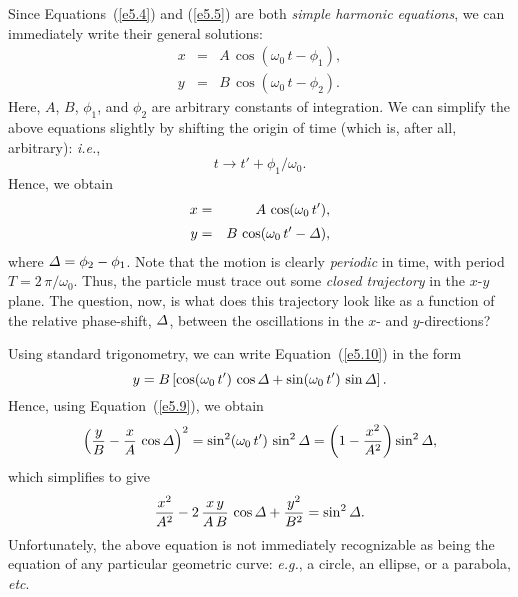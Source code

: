 Since Equations~(\ref{e5.4}) and (\ref{e5.5}) are both {\em simple harmonic equations},
we can immediately write their general solutions:
\begin{eqnarray}
x &=& A\,\cos(\omega_0\,t-\phi_1),\\[0.5ex]
y&=& B\,\cos(\omega_0\,t-\phi_2).
\end{eqnarray}
Here, $A$, $B$, $\phi_1$, and $\phi_2$ are arbitrary constants of integration. We can simplify the above equations slightly by shifting the
origin of time (which is, after all, arbitrary): {\em i.e.},
\begin{equation}
t\rightarrow t' + \phi_1/\omega_0.
\end{equation}
Hence, we obtain
\begin{eqnarray}\label{e5.9}
x &=& A\,\cos(\omega_0\,t'),\\[0.5ex]
y&=& B\,\cos(\omega_0\,t'-{\mit\Delta}),\label{e5.10}
\end{eqnarray}
where ${\mit\Delta}=\phi_2-\phi_1$. 
Note that the motion is clearly {\em periodic}\/ in time, with period $T=2\,\pi/\omega_0$.
Thus, the particle must trace out some {\em closed trajectory}\/ in the
$x$-$y$ plane.
The question, now, is what does this
trajectory look like  as a function of
the relative phase-shift, ${\mit\Delta}$, between the oscillations in the
$x$- and $y$-directions?

Using standard trigonometry, we can write Equation~(\ref{e5.10})
in the form
\begin{equation}
y = B\left[\cos(\omega_0\,t')\,\cos{\mit\Delta} + \sin(\omega_0\,t')\,\sin{\mit\Delta}\right].
\end{equation}
Hence, using Equation~(\ref{e5.9}), we obtain
\begin{equation}
\left(\frac{y}{B} - \frac{x}{A}\,\cos{\mit\Delta}\right)^2=\sin^2(\omega_0\,t')\,\sin^2{\mit\Delta} = \left(1-\frac{x^2}{A^2}\right)\sin^2{\mit\Delta},
\end{equation}
which simplifies to give
\begin{equation}\label{e5.13}
\frac{x^2}{A^2}  - 2\,\frac{x\,y}{A\,B} \,\cos{\mit\Delta} + \frac{y^2}{B^2}
= \sin^2{\mit\Delta}.
\end{equation}
Unfortunately, the above equation is not immediately recognizable as being
the equation of any particular geometric curve: {\em e.g.}, a circle, an ellipse, or
a parabola, {\em etc}.


